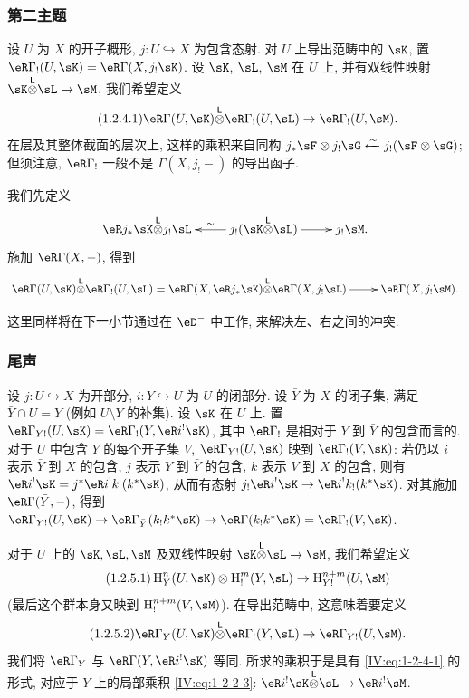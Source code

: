 \subsubsection{第二主题}\label{IV:1-2-4}

设 $U$ 为 $X$ 的开子概形, $j:U\hookrightarrow X$ 为包含态射.
对 $U$ 上导出范畴中的 $\sK$, 置
$\eR\Gamma_!(U,\sK)=\eR\Gamma(X,j_!\sK)$.
设 $\sK$, $\sL$, $\sM$ 在 $U$ 上, 并有双线性映射 $\sK\lotimes\sL\to\sM$, 我们希望定义
\begin{equation*}\tag{1.2.4.1}\label{IV:eq:1-2-4-1}
  \eR\Gamma(U,\sK)\lotimes\eR\Gamma_!(U,\sL)\to\eR\Gamma_!(U,\sM) \text{.}
\end{equation*}
在层及其整体截面的层次上, 这样的乘积来自同构
$j_*\sF\otimes j_!\sG\xleftarrow\sim j_!(\sF\otimes \sG)$;
但须注意, $\eR\Gamma_!$ 一般不是 $\Gamma(X,j_!-)$ 的导出函子.

我们先定义
\[\xymatrix{
  \eR j_* \sK\lotimes j_! \sL
    & \ar[l]_-\sim j_!(\sK\lotimes \sL) \ar[r]
    & j_!\sM \text{.}
}\]
施加 $\eR\Gamma(X,-)$, 得到
\[\xymatrix{
  \eR\Gamma(U,\sK)\lotimes\eR\Gamma_!(U,\sL) = \eR\Gamma(X,\eR j_*\sK)\lotimes \eR\Gamma(X,j_!\sL) \ar[r]
    & \eR\Gamma(X,j_! \sM) \text{.}
}\]

这里同样将在下一小节通过在 $\eD^-$ 中工作, 来解决左、右之间的冲突.

\subsubsection{尾声}\label{IV:1-2-5}

设 $j:U\hookrightarrow X$ 为开部分, $i:Y\hookrightarrow U$ 为 $U$ 的闭部分.
设 $\bar Y$ 为 $X$ 的闭子集, 满足 $\bar Y\cap U=Y$ (例如 $U\setminus Y$ 的补集).
设 $\sK$ 在 $U$ 上. 置
$\eR\Gamma_{Y!}(U,\sK)=\eR\Gamma_!(Y,\eR i^!\sK)$,
其中 $\eR\Gamma_!$ 是相对于 $Y$ 到 $\bar Y$ 的包含而言的.
对于 $U$ 中包含 $Y$ 的每个开子集 $V$, $\eR\Gamma_{Y!}(U,\sK)$ 映到 $\eR\Gamma_!(V,\sK)$:
若仍以 $i$ 表示 $\bar Y$ 到 $X$ 的包含, $j$ 表示 $Y$ 到 $\bar Y$ 的包含,
$k$ 表示 $V$ 到 $X$ 的包含, 则有
$\eR i^!\sK = j^*\eR i^! k_!(k^*\sK)$, 从而有态射
$j_!\eR i^!\sK \to \eR i^! k_!(k^*\sK)$.
对其施加 $\eR\Gamma(\bar Y,-)$, 得到
$\eR\Gamma_{Y!}(U,\sK)\to \eR\Gamma_{\bar Y}(k_! k^* \sK) \to \eR\Gamma(k_! k^*\sK) = \eR\Gamma_!(V,\sK)$.

对于 $U$ 上的 $\sK,\sL,\sM$ 及双线性映射
$\sK\lotimes\sL\to\sM$, 我们希望定义
\begin{equation*}\tag{1.2.5.1}\label{IV:eq:1-2-5-1}
  \h_Y^n(U,\sK)\otimes \h_!^m(Y,\sL) \to \h_{Y!}^{n+m}(U,\sM)
\end{equation*}
(最后这个群本身又映到 $\h_!^{n+m}(V,\sM)$).
在导出范畴中, 这意味着要定义
\begin{equation*}\tag{1.2.5.2}\label{IV:eq:1-2-5-2}
  \eR\Gamma_Y(U,\sK) \lotimes \eR\Gamma_!(Y,\sL) \to \eR\Gamma_{Y!}(U,\sM) \text{.}
\end{equation*}
我们将 $\eR\Gamma_Y$ 与 $\eR\Gamma(Y,\eR i^!\sK)$ 等同.
所求的乘积于是具有 \eqref{IV:eq:1-2-4-1} 的形式, 对应于 $Y$ 上的局部乘积
\eqref{IV:eq:1-2-2-3}:
$\eR i^! \sK\lotimes\sL \to \eR i^! \sM$.

